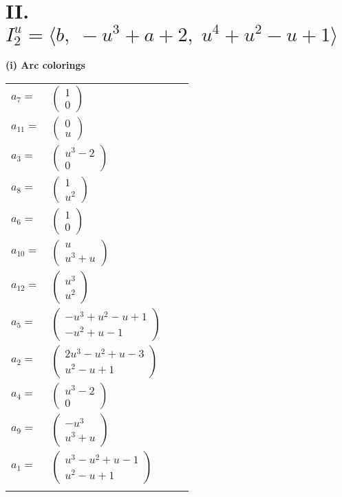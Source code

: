 \documentclass[1p]{elsarticle_modified}
\theoremstyle{definition}
\begin{document}
\centering \section*{II. $I^u_{2}= \langle b,\;- u^3+a+2,\;u^4+u^2- u+1 \rangle$}
\flushleft \textbf{(i) Arc colorings}\\
\begin{tabular}{m{7pt} m{180pt} m{7pt} m{180pt} }
\flushright $a_{7}=$&$\begin{pmatrix}1\\0\end{pmatrix}$ \\
\flushright $a_{11}=$&$\begin{pmatrix}0\\u\end{pmatrix}$ \\
\flushright $a_{3}=$&$\begin{pmatrix}u^3-2\\0\end{pmatrix}$ \\
\flushright $a_{8}=$&$\begin{pmatrix}1\\u^2\end{pmatrix}$ \\
\flushright $a_{6}=$&$\begin{pmatrix}1\\0\end{pmatrix}$ \\
\flushright $a_{10}=$&$\begin{pmatrix}u\\u^3+u\end{pmatrix}$ \\
\flushright $a_{12}=$&$\begin{pmatrix}u^3\\u^2\end{pmatrix}$ \\
\flushright $a_{5}=$&$\begin{pmatrix}- u^3+u^2- u+1\\- u^2+u-1\end{pmatrix}$ \\
\flushright $a_{2}=$&$\begin{pmatrix}2 u^3- u^2+u-3\\u^2- u+1\end{pmatrix}$ \\
\flushright $a_{4}=$&$\begin{pmatrix}u^3-2\\0\end{pmatrix}$ \\
\flushright $a_{9}=$&$\begin{pmatrix}- u^3\\u^3+u\end{pmatrix}$ \\
\flushright $a_{1}=$&$\begin{pmatrix}u^3- u^2+u-1\\u^2- u+1\end{pmatrix}$\\&\end{tabular}
\end{document}
